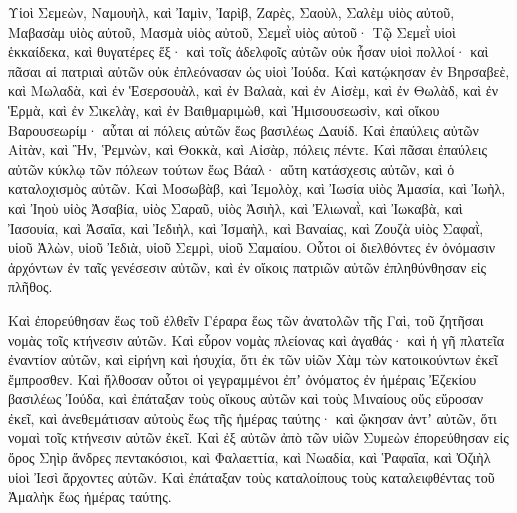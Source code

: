 {\par }{\PP {}Υἱοὶ Σεμεὼν, Ναμουὴλ, καὶ Ἰαμὶν, Ἰαρὶβ, Ζαρὲς, Σαοὺλ,
Σαλὲμ υἱὸς αὐτοῦ, Μαβασὰμ υἱὸς αὐτοῦ, Μασμὰ υἱὸς αὐτοῦ,
Σεμεῒ υἱὸς αὐτοῦ·
Τῷ Σεμεῒ υἱοὶ ἑκκαίδεκα, καὶ θυγατέρες ἕξ· καὶ τοῖς ἀδελφοῖς αὐτῶν οὐκ ἦσαν υἱοὶ πολλοί· καὶ πᾶσαι αἱ πατριαὶ αὐτῶν οὐκ ἐπλεόνασαν ὡς υἱοὶ Ἰούδα.
Καὶ κατῴκησαν ἐν Βηρσαβεὲ, καὶ Μωλαδὰ, καὶ ἐν Ἑσερσουὰλ,
καὶ ἐν Βαλαὰ, καὶ ἐν Αἰσὲμ, καὶ ἐν Θωλὰδ,
καὶ ἐν Ἑρμὰ, καὶ ἐν Σικελὰγ,
καὶ ἐν Βαιθμαριμὼθ, καὶ Ἡμισουσεωσὶν, καὶ οἴκου Βαρουσεωρίμ· αὗται αἱ πόλεις αὐτῶν ἕως βασιλέως Δαυίδ.
Καὶ ἐπαύλεις αὐτῶν Αἰτὰν, καὶ Ἢν, Ῥεμνὼν, καὶ Θοκκὰ, καὶ Αἰσὰρ, πόλεις πέντε.
Καὶ πᾶσαι ἐπαύλεις αὐτῶν κύκλῳ τῶν πόλεων τούτων ἕως Βάαλ· αὕτη κατάσχεσις αὐτῶν, καὶ ὁ καταλοχισμὸς αὐτῶν.
Καὶ Μοσωβὰβ, καὶ Ἰεμολὸχ, καὶ Ἰωσία υἱὸς Ἀμασία,
καὶ Ἰωὴλ, καὶ Ἰηοὺ υἱὸς Ἀσαβία, υἱὸς Σαραῦ, υἱὸς Ἀσιὴλ,
καὶ Ἐλιωναῒ, καὶ Ἰωκαβὰ, καὶ Ἰασουία, καὶ Ἀσαΐα, καὶ Ἰεδιὴλ, καὶ Ἰσμαὴλ, καὶ Βαναίας, καὶ Ζουζὰ υἱὸς Σαφαῒ,
υἱοῦ Ἀλὼν, υἱοῦ Ἰεδιὰ, υἱοῦ Σεμρὶ, υἱοῦ Σαμαίου.
Οὗτοι οἱ διελθόντες ἐν ὀνόμασιν ἀρχόντων ἐν ταῖς γενέσεσιν αὐτῶν, καὶ ἐν οἴκοις πατριῶν αὐτῶν ἐπληθύνθησαν εἰς πλῆθος.
\par }{\PP {}Καὶ ἐπορεύθησαν ἕως τοῦ ἐλθεῖν Γέραρα ἕως τῶν ἀνατολῶν τῆς Γαὶ, τοῦ ζητῆσαι νομὰς τοῖς κτήνεσιν αὐτῶν.
Καὶ εὗρον νομὰς πλείονας καὶ ἀγαθάς· καὶ ἡ γῆ πλατεῖα ἐναντίον αὐτῶν, καὶ εἰρήνη καὶ ἡσυχία, ὅτι ἐκ τῶν υἱῶν Χὰμ τὼν κατοικούντων ἐκεῖ ἔμπροσθεν.
Καὶ ἤλθοσαν οὗτοι οἱ γεγραμμένοι ἐπʼ ὀνόματος ἐν ἡμέραις Ἐζεκίου βασιλέως Ἰούδα, καὶ ἐπάταξαν τοὺς οἴκους αὐτῶν καὶ τοὺς Μιναίους οὕς εὕροσαν ἐκεῖ, καὶ ἀνεθεμάτισαν αὐτοὺς ἕως τῆς ἡμέρας ταύτης· καὶ ᾤκησαν ἀντʼ αὐτῶν, ὅτι νομαὶ τοῖς κτήνεσιν αὐτῶν ἐκεῖ.
Καὶ ἐξ αὐτῶν ἀπὸ τῶν υἱῶν Συμεὼν ἐπορεύθησαν εἰς ὄρος Σηὶρ ἄνδρες πεντακόσιοι, καὶ Φαλαεττία, καὶ Νωαδία, καὶ Ῥαφαΐα, καὶ Ὀζιὴλ υἱοὶ Ἰεσὶ ἄρχοντες αὐτῶν.
Καὶ ἐπάταξαν τοὺς καταλοίπους τοὺς καταλειφθέντας τοῦ Ἀμαλὴκ ἕως ἡμέρας ταύτης.

}
